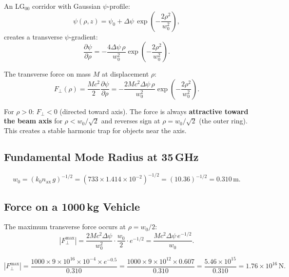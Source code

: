 \documentclass[aps,prd,twocolumn,superscriptaddress]{revtex4-2}
\begin{document}
An LG$_{00}$ corridor with Gaussian $\psi$-profile:
\begin{equation}
\psi(\rho,z) = \psi_0 + \Delta\psi\,\exp\!\left(-\frac{2\rho^2}{w_0^2}\right),
\end{equation}
creates a transverse $\psi$-gradient:
\begin{equation}
\frac{\partial\psi}{\partial\rho} = -\frac{4\Delta\psi\,\rho}{w_0^2}
\exp\!\left(-\frac{2\rho^2}{w_0^2}\right).
\label{eq:dpsi_drho}
\end{equation}

The transverse force on mass $M$ at displacement $\rho$:
\begin{equation}
F_\perp(\rho) = \frac{Mc^2}{2}\frac{\partial\psi}{\partial\rho}
= -\frac{2Mc^2\Delta\psi\,\rho}{w_0^2}
\exp\!\left(-\frac{2\rho^2}{w_0^2}\right).
\label{eq:trap_force}
\end{equation}

For $\rho > 0$: $F_\perp < 0$ (directed toward axis).  The force
is always \textbf{attractive toward the beam axis} for $\rho < w_0/\sqrt{2}$
and reverses sign at $\rho = w_0/\sqrt{2}$ (the outer ring).  This
creates a stable harmonic trap for objects near the axis.

\subsection{Fundamental Mode Radius at 35\,GHz}

\begin{equation}
w_0 = (k_0 n_\mathrm{ax}\,g)^{-1/2}
= (733\times1.414\times10^{-2})^{-1/2}
= (10.36)^{-1/2} = 0.310\,\mathrm{m}.
\end{equation}

\subsection{Force on a 1000\,kg Vehicle}

The maximum transverse force occurs at $\rho = w_0/2$:
\begin{equation}
|F_\perp^\mathrm{max}| = \frac{2Mc^2\Delta\psi}{w_0^2}
\cdot\frac{w_0}{2}\cdot e^{-1/2}
= \frac{Mc^2\Delta\psi\,e^{-1/2}}{w_0}.
\end{equation}

\begin{equation}
|F_\perp^\mathrm{max}| = \frac{1000\times9\times10^{16}\times10^{-4}\times e^{-0.5}}
{0.310}
= \frac{1000\times9\times10^{12}\times0.607}{0.310}
= \frac{5.46\times10^{15}}{0.310}
= 1.76\times10^{16}\,\mathrm{N}.
\label{eq:F_max}
\end{equation}
\end{document}
